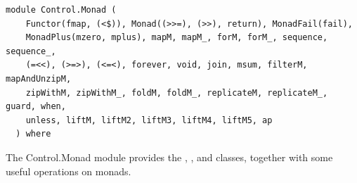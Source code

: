 \label{module:Control.Monad}
\haddockbeginheader
{\haddockverb\begin{verbatim}
module Control.Monad (
    Functor(fmap, (<$)), Monad((>>=), (>>), return), MonadFail(fail),
    MonadPlus(mzero, mplus), mapM, mapM_, forM, forM_, sequence, sequence_,
    (=<<), (>=>), (<=<), forever, void, join, msum, filterM, mapAndUnzipM,
    zipWithM, zipWithM_, foldM, foldM_, replicateM, replicateM_, guard, when,
    unless, liftM, liftM2, liftM3, liftM4, liftM5, ap
  ) where\end{verbatim}}
\haddockendheader

The Control.Monad module provides the , ,  and
  classes, together with some useful operations on monads.\par
